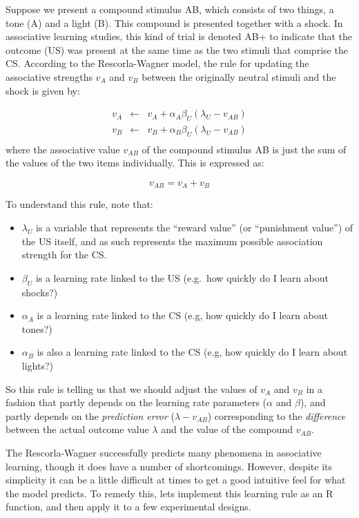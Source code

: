 \documentclass[]{book}
\providecommand{\tightlist}{%
  \setlength{\itemsep}{0pt}\setlength{\parskip}{0pt}}
\begin{document}
Suppose we present a compound stimulus AB, which consists of two things, a tone (A) and a light (B). This compound is presented together with a shock. In associative learning studies, this kind of trial is denoted AB+ to indicate that the outcome (US) was present at the same time as the two stimuli that comprise the CS. According to the Rescorla-Wagner model, the rule for updating the associative strengths \(v_A\) and \(v_B\) between the originally neutral stimuli and the shock is given by:

\[
\begin{array}{rcl}
v_A &\leftarrow& v_A + \alpha_A \beta_U (\lambda_U - v_{AB}) \\
v_B &\leftarrow& v_B + \alpha_B \beta_U (\lambda_U - v_{AB}) \\
\end{array}
\]
where the associative value \(v_{AB}\) of the compound stimulus AB is just the sum of the values of the two items individually. This is expressed as:

\[
v_{AB} = v_A + v_B
\]

To understand this rule, note that:

\begin{itemize}
\tightlist
\item
  \(\lambda_U\) is a variable that represents the ``reward value'' (or ``punishment value'') of the US itself, and as such represents the maximum possible association strength for the CS.
\item
  \(\beta_U\) is a learning rate linked to the US (e.g.~how quickly do I learn about shocks?)
\item
  \(\alpha_A\) is a learning rate linked to the CS (e.g, how quickly do I learn about tones?)
\item
  \(\alpha_B\) is also a learning rate linked to the CS (e.g, how quickly do I learn about lights?)
\end{itemize}

So this rule is telling us that we should adjust the values of \(v_A\) and \(v_B\) in a fashion that partly depends on the learning rate parameters (\(\alpha\) and \(\beta\)), and partly depends on the \emph{prediction error} (\(\lambda - v_{AB}\)) corresponding to the \emph{difference} between the actual outcome value \(\lambda\) and the value of the compound \(v_{AB}\).

The Rescorla-Wagner successfully predicts many phenomena in associative learning, though it does have a number of shortcomings. However, despite its simplicity it can be a little difficult at times to get a good intuitive feel for what the model predicts. To remedy this, lets implement this learning rule as an R function, and then apply it to a few experimental designs.
\end{document}
